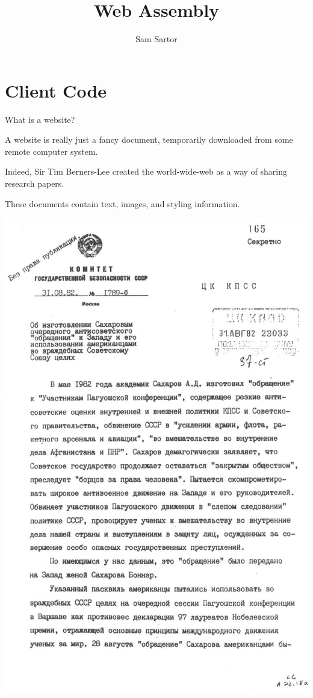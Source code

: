\documentclass{lug}
\title{Web Assembly}
\author{Sam Sartor}
\institute{Mines Linux Users Group}
\newcommand{\pmidg}[1]{\parbox{\widthof{#1}}{#1}}
\newcommand{\splitslide}[4]{%
    \noindent
    \begin{minipage}{#1 \textwidth - #2 }
        #3
    \end{minipage}%
    \hspace{ \dimexpr #2 * 2 \relax }%
    \begin{minipage}{\textwidth - #1 \textwidth - #2 }
        #4
    \end{minipage}
}
\begin{document}
\newcommand{\secimage}{graphics/html_icon}
\section{Client Code}

\begin{frame}{What is a website?}
    \splitslide{0.7}{1em}{

        A website is really just a fancy document, temporarily downloaded from
        some remote computer system.

        \vspace{2ex}

        Indeed, Sir Tim Berners-Lee created the world-wide-web as a way of
        sharing research papers.

        \vspace{2ex}

        These documents contain text, images, and styling information.

    }{\pmidg{
        \includegraphics[width=\columnwidth]{graphics/cyrillic_doc}
    }}
\end{frame}
\end{document}
